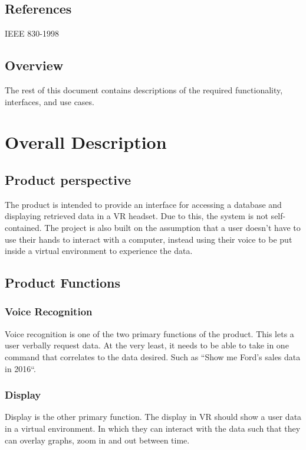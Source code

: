 \documentclass[onecolumn, draftclsnofoot,10pt, compsoc]{IEEEtran}
\begin{document}
    \subsection{References}
        IEEE 830-1998

    \subsection{Overview}
        The rest of this document contains descriptions of the required functionality, interfaces, and use cases.
    \section{Overall Description}

    \subsection{Product perspective}
        The product is intended to provide an interface for accessing a database and displaying retrieved data in a VR headset. Due to this, the system is not self-contained. The project is also built on the assumption that a user doesn’t have to use their hands to interact with a computer, instead using their voice to be put inside a virtual environment to experience the data.

    \subsection{Product Functions}

        \subsubsection{Voice Recognition}
            Voice recognition is one of the two primary functions of the product. This lets a user verbally request data. At the very least, it needs to be able to take in one command that correlates to the data desired. Such as ``Show me Ford’s sales data in 2016``.

        \subsubsection{Display}
            Display is the other primary function. The display in VR should show a user data in a virtual environment. In which they can interact with the data such that they can overlay graphs, zoom in and out between time.
\end{document}
